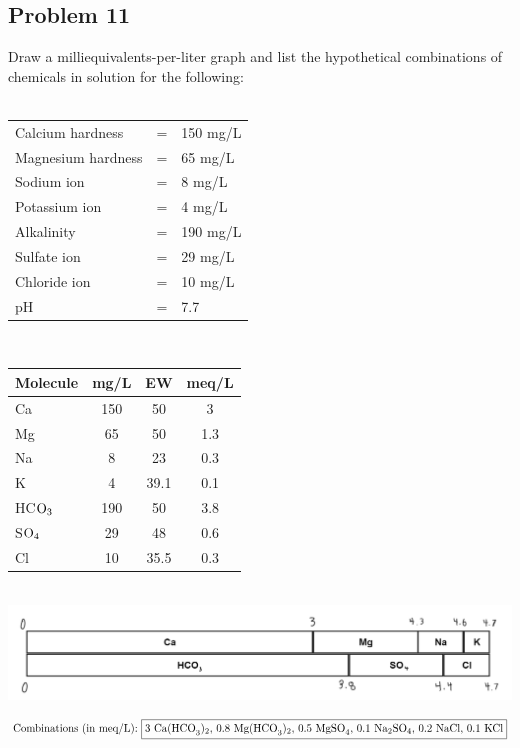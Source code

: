 \subsection*{Problem 11}
Draw a milliequivalents-per-liter graph and list the hypothetical combinations of chemicals in solution for the following:\\\\
\begin{tabular}{l c l}
    Calcium hardness & = & 150 mg/L \\
    Magnesium hardness & = & 65 mg/L \\
    Sodium ion & = & 8 mg/L \\
    Potassium ion & = & 4 mg/L \\
    Alkalinity & = & 190 mg/L \\
    Sulfate ion & = & 29 mg/L \\
    Chloride ion & = & 10 mg/L \\
    pH & = &  7.7
\end{tabular}
\\
\begin{center}
\begin{tabular}{l c c c}
    Molecule & mg/L & EW & meq/L\\
    \hline
    Ca & 150 & 50 & 3\\
    Mg & 65 & 50 & 1.3\\
    Na & 8 & 23 & 0.3\\
    K & 4 & 39.1 & 0.1\\
    HC\(\textnormal{O}_3\) & 190 & 50 & 3.8\\
    S\(\textnormal{O}_4\) & 29 & 48 & 0.6\\
    Cl & 10 & 35.5 & 0.3
\end{tabular}\\
\includegraphics[scale=0.33]{diagram3.png}
\end{center}
\[\textnormal{Combinations (in meq/L): } \boxed{3 \textnormal{ Ca(HCO}_3)_2,\,0.8 \textnormal{ Mg(HCO}_3)_2,\,0.5\textnormal{ MgSO}_4,\,0.1\textnormal{ Na}_2\textnormal{SO}_4,\,0.2\textnormal{ NaCl},\,0.1\textnormal{ KCl}}\]
